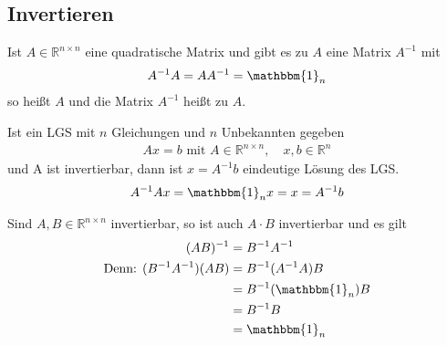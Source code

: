\subsection{Invertieren}
Ist $A \in \mathbb{R}^{n \times n}$ eine quadratische Matrix und gibt es zu $A$ eine Matrix $A^{-1}$ mit
\begin{align*}
	A^{-1} A = A A^{-1} = \mathbbm{1}_n
\end{align*}
so heißt $A$  und die Matrix $A^{-1}$ heißt  zu $A$.

\vspace{1cm}

Ist ein LGS mit $n$ Gleichungen und $n$ Unbekannten gegeben
\begin{align*}
	Ax = b\text{ mit }A \in \mathbb{R}^{n \times n},\quad x, b \in \mathbb{R}^n
\end{align*}
und A ist invertierbar, dann ist $x = A^{-1}b$ eindeutige Lösung des LGS.
\begin{align*}
	A^{-1}Ax = \mathbbm{1}_nx = x = A^{-1}b
\end{align*}

Sind $A, B \in \mathbb{R}^{n \times n}$ invertierbar, so ist auch $A \cdot B$ invertierbar und es gilt
\begin{align*}
	(AB)^{-1} &= B^{-1}A^{-1} \\
	\text{Denn: } (B^{-1}A^{-1})(AB) &= B^{-1}(A^{-1}A)B \\
	&= B^{-1} (\mathbbm{1}_n) B \\
	&= B^{-1}B \\
	&= \mathbbm{1}_n
\end{align*}

